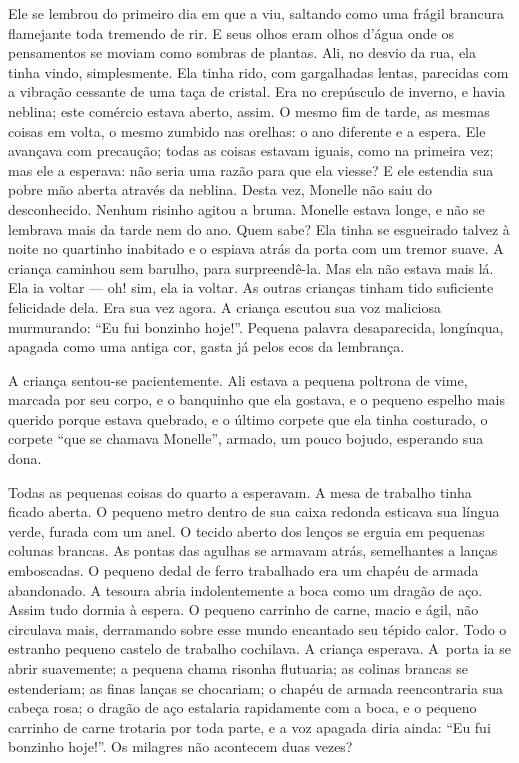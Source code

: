 Ele se lembrou do primeiro dia em que a viu, saltando como uma frágil
brancura flamejante toda tremendo de rir. E seus olhos eram olhos d'água
onde os pensamentos se moviam como sombras de plantas. Ali, no desvio da
rua, ela tinha vindo, simplesmente. Ela tinha rido, com gargalhadas
lentas, parecidas com a vibração cessante de uma taça de cristal. Era no
crepúsculo de inverno, e havia neblina; este comércio estava aberto, assim. O
mesmo fim de tarde, as mesmas coisas em volta, o mesmo zumbido nas orelhas: o ano
diferente e a espera. Ele avançava com precaução; todas as coisas estavam
iguais, como na primeira vez; mas ele a esperava: não seria uma razão para
que ela viesse? E ele estendia sua pobre mão aberta através da neblina.
\pagebreak
Desta vez, Monelle não saiu do desconhecido. Nenhum risinho agitou a
bruma. Monelle estava longe, e não se lembrava mais da tarde nem do ano.
Quem sabe? Ela tinha se esgueirado talvez à noite no quartinho inabitado e
o espiava atrás da porta com um tremor suave. A criança caminhou sem
barulho, para surpreendê-la. Mas ela não estava mais lá. Ela ia voltar ---
oh! sim, ela ia voltar. As outras crianças tinham tido suficiente
felicidade dela. Era sua vez agora. A criança escutou sua voz maliciosa
murmurando: “Eu fui bonzinho hoje!”. Pequena palavra desaparecida,
longínqua, apagada como uma antiga cor, gasta já pelos ecos da lembrança.

A criança sentou-se pacientemente. Ali estava a pequena poltrona de
vime, marcada por seu corpo, e o banquinho que ela gostava, e o pequeno
espelho mais querido porque estava quebrado, e o último corpete que ela
tinha costurado, o corpete “que se chamava Monelle”, armado, um pouco
bojudo, esperando sua dona.

Todas as pequenas coisas do quarto a esperavam. A mesa de trabalho
tinha ficado aberta. O pequeno metro dentro de sua caixa redonda esticava
sua língua verde, furada com um anel. O tecido aberto dos lenços se erguia
em pequenas colunas brancas. As pontas das agulhas se armavam atrás,
semelhantes a lanças emboscadas. O pequeno dedal de ferro trabalhado era
um chapéu de armada abandonado. A tesoura abria indolentemente a boca como
um dragão de aço. Assim tudo dormia à espera. O pequeno carrinho de carne,
macio e ágil, não circulava mais, derramando sobre esse mundo encantado
seu tépido calor. Todo o estranho pequeno castelo de trabalho cochilava. A
criança esperava. \mbox{A porta} ia se abrir suavemente; a pequena chama risonha
flutuaria; as colinas brancas se estenderiam; as finas lanças se
chocariam; o chapéu de armada reencontraria sua cabeça rosa; o dragão de
aço estalaria rapidamente com a boca, e o pequeno carrinho de carne
trotaria por toda parte, e a voz apagada diria ainda: “Eu fui bonzinho
hoje!”. Os milagres não acontecem duas vezes?

